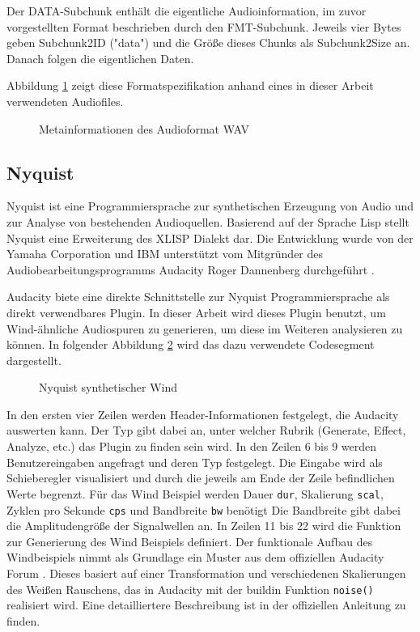 Der DATA-Subchunk enthält die eigentliche Audioinformation, im zuvor vorgestellten Format beschrieben durch den FMT-Subchunk. Jeweils vier Bytes geben Subchunk2ID ("data") und die Größe dieses Chunks als Subchunk2Size an. Danach folgen die eigentlichen Daten.

Abbildung \ref{fig:wav} zeigt diese Formatspezifikation anhand eines in dieser Arbeit verwendeten Audiofiles.

\begin{figure}[hbt!]
	\centering
	
	\caption{Metainformationen des Audioformat WAV}
	\label{fig:wav}
\end{figure}

\subsection{Nyquist}
Nyquist ist eine Programmiersprache zur synthetischen Erzeugung von Audio und zur Analyse von bestehenden Audioquellen. Basierend auf der Sprache Lisp stellt Nyquist eine Erweiterung des XLISP Dialekt dar. Die Entwicklung wurde von der Yamaha Corporation und IBM unterstützt vom Mitgründer des Audiobearbeitungsprogramms Audacity Roger Dannenberg durchgeführt \cite{nyquist_official}.

Audacity biete eine direkte Schnittstelle zur Nyquist Programmiersprache als direkt verwendbares Plugin. In dieser Arbeit wird dieses Plugin benutzt, um Wind-ähnliche Audiospuren zu generieren, um diese im Weiteren analysieren zu können. In folgender Abbildung \ref{sub:nyquist-wind} wird das dazu verwendete Codesegment dargestellt.
\begin{figure}[t!]
		
		\caption{Nyquist synthetischer Wind}
		\label{sub:nyquist-wind}
\end{figure}

In den ersten vier Zeilen werden Header-Informationen festgelegt, die Audacity auswerten kann. Der Typ gibt dabei an, unter welcher Rubrik (Generate, Effect, Analyze, etc.) das Plugin zu finden sein wird. In den Zeilen 6 bis 9 werden Benutzereingaben angefragt und deren Typ festgelegt. Die Eingabe wird als Schieberegler visualisiert und durch die jeweils am Ende der Zeile befindlichen Werte begrenzt. Für das Wind Beispiel werden Dauer \texttt{dur}, Skalierung \texttt{scal}, Zyklen pro Sekunde \texttt{cps} und Bandbreite \texttt{bw} benötigt Die Bandbreite gibt dabei die Amplitudengröße der Signalwellen an.
In Zeilen 11 bis 22 wird die Funktion zur Generierung des Wind Beispiels definiert.
Der funktionale Aufbau des Windbeispiels nimmt als Grundlage ein Muster aus dem offiziellen Audacity Forum \cite{wind_effect}. Dieses basiert auf einer Transformation und verschiedenen Skalierungen des Weißen Rauschens, das in Audacity mit der buildin Funktion \texttt{noise()} realisiert wird. Eine detailliertere Beschreibung ist in der offiziellen Anleitung \cite{ny_manual} zu finden.

